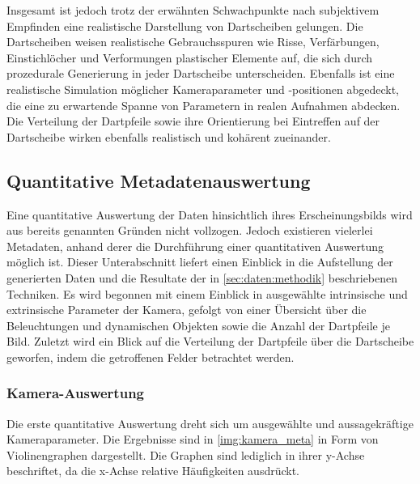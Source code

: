 Insgesamt ist jedoch trotz der erwähnten Schwachpunkte nach subjektivem Empfinden eine realistische Darstellung von Dartscheiben gelungen. Die Dartscheiben weisen realistische Gebrauchsspuren wie Risse, Verfärbungen, Einstichlöcher und Verformungen plastischer Elemente auf, die sich durch prozedurale Generierung in jeder Dartscheibe unterscheiden. Ebenfalls ist eine realistische Simulation möglicher Kameraparameter und -positionen abgedeckt, die eine zu erwartende Spanne von Parametern in realen Aufnahmen abdecken. Die Verteilung der Dartpfeile sowie ihre Orientierung bei Eintreffen auf der Dartscheibe wirken ebenfalls realistisch und kohärent zueinander.


\newpage
\subsection{Quantitative Metadatenauswertung} %
\label{sec:metadaten}

Eine quantitative Auswertung der Daten hinsichtlich ihres Erscheinungsbilds wird aus bereits genannten Gründen nicht vollzogen. Jedoch existieren vielerlei Metadaten, anhand derer die Durchführung einer quantitativen Auswertung möglich ist. Dieser Unterabschnitt liefert einen Einblick in die Aufstellung der generierten Daten und die Resultate der in \autoref{sec:daten:methodik} beschriebenen Techniken. Es wird begonnen mit einem Einblick in ausgewählte intrinsische und extrinsische Parameter der Kamera, gefolgt von einer Übersicht über die Beleuchtungen und dynamischen Objekten sowie die Anzahl der Dartpfeile je Bild. Zuletzt wird ein Blick auf die Verteilung der Dartpfeile über die Dartscheibe geworfen, indem die getroffenen Felder betrachtet werden.

\subsubsection{Kamera-Auswertung}
\label{sec:kamera_ergebnisse}

Die erste quantitative Auswertung dreht sich um ausgewählte und aussagekräftige Kameraparameter. Die Ergebnisse sind in \autoref{img:kamera_meta} in Form von Violinengraphen dargestellt. Die Graphen sind lediglich in ihrer y-Achse beschriftet, da die x-Achse relative Häufigkeiten ausdrückt.


